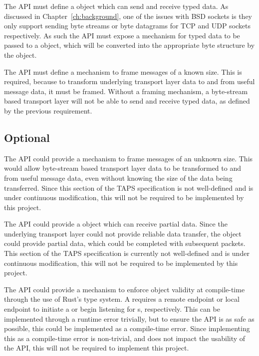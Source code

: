 The API must define a \connection{} object which can send and receive typed data.
As discussed in Chapter~\ref{ch:background}, one of the issues with BSD sockets is they only support sending byte
streams or byte datagrams for TCP and UDP sockets respectively.
As such the API must expose a mechanism for typed data to be passed to a \connection{} object, which will be converted
into the appropriate byte structure by the \connection{} object.

The API must define a mechanism to frame messages of a known size.
This is required, because to transform underlying transport layer data to and from useful message data, it must be
framed.
Without a framing mechanism, a byte-stream based transport layer will not be able to send and receive typed data,
as defined by the previous requirement.

\subsection{Optional}\label{subsec:optional}

The API could provide a mechanism to frame messages of an unknown size.
This would allow byte-stream based transport layer data to be transformed to and from useful message data, even without
knowing the size of the data being transferred.
Since this section of the TAPS specification is not well-defined and is under continuous modification, this will not be
required to be implemented by this project.

The API could provide a \connection{} object which can receive partial data.
Since the underlying transport layer could not provide reliable data transfer, the \connection{} object could provide
partial data, which could be completed with subsequent packets.
This section of the TAPS specification is currently not well-defined and is under continuous modification, this will not
be required to be implemented by this project.

The API could provide a mechanism to enforce \preconnection{} object validity at compile-time through the use of Rust's
type system.
A \preconnection{} requires a remote endpoint or local endpoint to initiate a \connection{} or begin listening for
\connection{}s, respectively.
This can be implemented through a runtime error trivially, but to ensure the API is as safe as possible, this could be
implemented as a compile-time error.
Since implementing this as a compile-time error is non-trivial, and does not impact the usability of the API, this will
not be required to implement this project.

